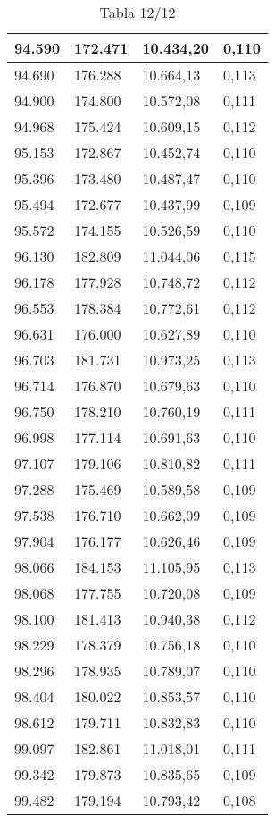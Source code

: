 \begin{table}[H]
{\begin{tabular}{| l | l | l |l |}
94.590	&	172.471	&	10.434,20	&	0,110	\\ \hline
94.690	&	176.288	&	10.664,13	&	0,113	\\ \hline
94.900	&	174.800	&	10.572,08	&	0,111	\\ \hline
94.968	&	175.424	&	10.609,15	&	0,112	\\ \hline
95.153	&	172.867	&	10.452,74	&	0,110	\\ \hline
95.396	&	173.480	&	10.487,47	&	0,110	\\ \hline
95.494	&	172.677	&	10.437,99	&	0,109	\\ \hline
95.572	&	174.155	&	10.526,59	&	0,110	\\ \hline
96.130	&	182.809	&	11.044,06	&	0,115	\\ \hline
96.178	&	177.928	&	10.748,72	&	0,112	\\ \hline
96.553	&	178.384	&	10.772,61	&	0,112	\\ \hline
96.631	&	176.000	&	10.627,89	&	0,110	\\ \hline
96.703	&	181.731	&	10.973,25	&	0,113	\\ \hline
96.714	&	176.870	&	10.679,63	&	0,110	\\ \hline
96.750	&	178.210	&	10.760,19	&	0,111	\\ \hline
96.998	&	177.114	&	10.691,63	&	0,110	\\ \hline
97.107	&	179.106	&	10.810,82	&	0,111	\\ \hline
97.288	&	175.469	&	10.589,58	&	0,109	\\ \hline
97.538	&	176.710	&	10.662,09	&	0,109	\\ \hline
97.904	&	176.177	&	10.626,46	&	0,109	\\ \hline
98.066	&	184.153	&	11.105,95	&	0,113	\\ \hline
98.068	&	177.755	&	10.720,08	&	0,109	\\ \hline
98.100	&	181.413	&	10.940,38	&	0,112	\\ \hline
98.229	&	178.379	&	10.756,18	&	0,110	\\ \hline
98.296	&	178.935	&	10.789,07	&	0,110	\\ \hline
98.404	&	180.022	&	10.853,57	&	0,110	\\ \hline
98.612	&	179.711	&	10.832,83	&	0,110	\\ \hline
99.097	&	182.861	&	11.018,01	&	0,111	\\ \hline
99.342	&	179.873	&	10.835,65	&	0,109	\\ \hline
99.482	&	179.194	&	10.793,42	&	0,108	\\ \hline

    
  \end{tabular}
  \caption*{Tabla 12/12}
}
\end{table}
\newpage
